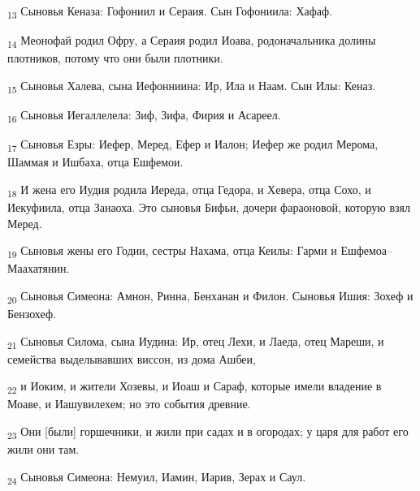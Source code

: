 \begin{tcolorbox}
\textsubscript{13} Сыновья Кеназа: Гофониил и Сераия. Сын Гофониила: Хафаф.
\end{tcolorbox}
\begin{tcolorbox}
\textsubscript{14} Меонофай родил Офру, а Сераия родил Иоава, родоначальника долины плотников, потому что они были плотники.
\end{tcolorbox}
\begin{tcolorbox}
\textsubscript{15} Сыновья Халева, сына Иефонниина: Ир, Ила и Наам. Сын Илы: Кеназ.
\end{tcolorbox}
\begin{tcolorbox}
\textsubscript{16} Сыновья Иегаллелела: Зиф, Зифа, Фирия и Асареел.
\end{tcolorbox}
\begin{tcolorbox}
\textsubscript{17} Сыновья Езры: Иефер, Меред, Ефер и Иалон; Иефер же родил Мерома, Шаммая и Ишбаха, отца Ешфемои.
\end{tcolorbox}
\begin{tcolorbox}
\textsubscript{18} И жена его Иудия родила Иереда, отца Гедора, и Хевера, отца Сохо, и Иекуфиила, отца Занаоха. Это сыновья Бифьи, дочери фараоновой, которую взял Меред.
\end{tcolorbox}
\begin{tcolorbox}
\textsubscript{19} Сыновья жены его Годии, сестры Нахама, отца Кеилы: Гарми и Ешфемоа--Маахатянин.
\end{tcolorbox}
\begin{tcolorbox}
\textsubscript{20} Сыновья Симеона: Амнон, Ринна, Бенханан и Филон. Сыновья Ишия: Зохеф и Бензохеф.
\end{tcolorbox}
\begin{tcolorbox}
\textsubscript{21} Сыновья Силома, сына Иудина: Ир, отец Лехи, и Лаеда, отец Мареши, и семейства выделывавших виссон, из дома Ашбеи,
\end{tcolorbox}
\begin{tcolorbox}
\textsubscript{22} и Иоким, и жители Хозевы, и Иоаш и Сараф, которые имели владение в Моаве, и Иашувилехем; но это события древние.
\end{tcolorbox}
\begin{tcolorbox}
\textsubscript{23} Они [были] горшечники, и жили при садах и в огородах; у царя для работ его жили они там.
\end{tcolorbox}
\begin{tcolorbox}
\textsubscript{24} Сыновья Симеона: Немуил, Иамин, Иарив, Зерах и Саул.
\end{tcolorbox}
